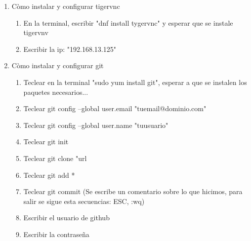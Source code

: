 \documentclass[letterpaper, 12pt, oneside]{article}%
\begin{document}
\begin{enumerate}
\begin{itemize}
				
	\end{itemize}%
	\item Còmo instalar y configurar tigervnc
		\begin{enumerate}
			\item En la terminal, escribir "dnf install tygervnc" y esperar que se instale tigervnv
			\item Escribir la ip: "192.168.13.125"
		\end{enumerate}
	\item Còmo instalar y configurar git
		\begin{enumerate}
			\item Teclear en la terminal "sudo yum install git", esperar a que se instalen los paquetes necesarios...
			\item Teclear  git config --global user.email "tuemail@dominio.com"
			\item Teclear  git config --global user.name "tuusuario"      
			\item Teclear  git init
			\item Teclear  git clone "url
			\item Teclear git add *
			\item Teclear git commit (Se escribe un comentario sobre lo que hicimos, para salir se sigue esta secuencias: ESC, :wq)
			\item Escribir el usuario de github
			\item Escribir la contraseña
		\end{enumerate}
	
	
	
	
\end{enumerate}%
	
\end{document}
